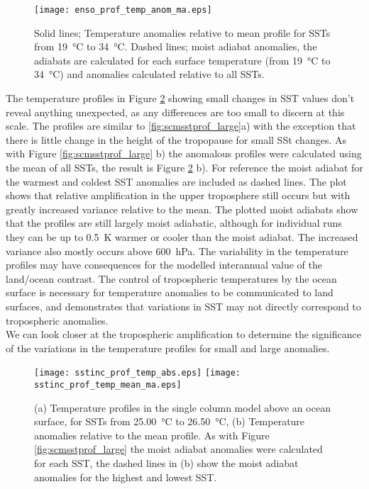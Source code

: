 \begin{figure}[ht]
\texttt{[image: enso\_prof\_temp\_anom\_ma.eps]}
\caption{Solid lines; Temperature anomalies relative to mean profile for SSTs 
from \SI{19}{\degreeCelsius} to \SI{34}{\degreeCelsius}. Dashed lines; moist 
adiabat anomalies, the adiabats are calculated for each surface temperature 
(from \SI{19}{\degreeCelsius} to \SI{34}{\degreeCelsius}) and anomalies 
calculated relative to all SSTs.}
\label{fig:scmsstprof_ma}
\end{figure}

The temperature profiles in Figure \ref{fig:scmsstinc_prof} showing small 
changes in SST values don't reveal anything unexpected, as any differences are 
too small to discern at this scale. The profiles are similar to 
\ref{fig:scmsstprof_large}a) with the exception that there is little change in 
the height of the tropopause for small SSt changes. As with Figure 
\ref{fig:scmsstprof_large} b) the anomalous profiles were calculated using the 
mean of all SSTs, the result is Figure \ref{fig:scmsstinc_prof} b). For 
reference the moist adiabat for the warmest and coldest SST anomalies are 
included as dashed lines. The plot shows that relative amplification in the 
upper troposphere still occurs but with greatly increased variance relative to 
the mean. The plotted moist adiabats show that the profiles are still largely 
moist adiabatic, although for individual runs they can be up to 
\SI{0.5}{\kelvin} warmer or cooler than the moist adiabat. The increased 
variance also mostly occurs above \SI{600}{\hecto\pascal}. The variability in 
the temperature profiles may have consequences for the modelled interannual 
value of the land/ocean contrast. The control of tropospheric temperatures by 
the ocean surface is necessary for temperature anomalies to be communicated to 
land surfaces, and demonstrates that variations in SST may not directly 
correspond to tropospheric anomalies.\\
We can look closer at the tropospheric amplification to determine the 
significance of the variations in the temperature profiles for small and large 
anomalies.


\begin{figure}[ht]
\texttt{[image: sstinc\_prof\_temp\_abs.eps]}
\texttt{[image: sstinc\_prof\_temp\_mean\_ma.eps]}
\caption{(a) Temperature profiles in the single column model above an ocean 
surface, for SSTs from \SI{25.00}{\degreeCelsius} to \SI{26.50}{\degreeCelsius}, 
(b) Temperature anomalies relative to the mean profile. As with Figure 
\ref{fig:scmsstprof_large} the moist adiabat anomalies were calculated for each 
SST, the dashed lines in (b) show the moist adiabat anomalies for the highest 
and lowest SST.}
\label{fig:scmsstinc_prof}
\end{figure}

